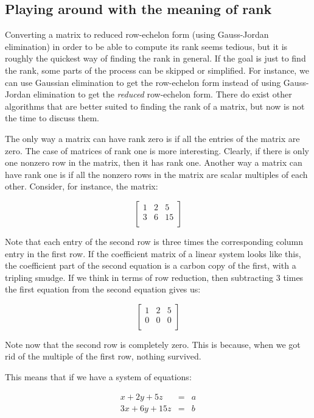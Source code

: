 \documentclass[10pt]{amsart}
\begin{document}
\subsection{Playing around with the meaning of rank}

Converting a matrix to reduced row-echelon form (using Gauss-Jordan
elimination) in order to be able to compute its rank seems tedious,
but it is roughly the quickest way of finding the rank in general. If
the goal is just to find the rank, some parts of the process can be
skipped or simplified. For instance, we can use Gaussian elimination
to get the row-echelon form instead of using Gauss-Jordan elimination
to get the {\em reduced} row-echelon form. There do exist other
algorithms that are better suited to finding the rank of a matrix, but
now is not the time to discuss them.

The only way a matrix can have rank zero is if all the entries of the
matrix are zero. The case of matrices of rank one is more
interesting. Clearly, if there is only one nonzero row in the matrix,
then it has rank one. Another way a matrix can have rank one is if all
the nonzero rows in the matrix are scalar multiples of each
other. Consider, for instance, the matrix:

$$\left[\begin{matrix}
1 & 2 & 5 \\
3 & 6 & 15 \\\end{matrix}
\right]$$

Note that each entry of the second row is three times the
corresponding column entry in the first row. If the coefficient matrix
of a linear system looks like this, the coefficient part of the second
equation is a carbon copy of the first, with a tripling smudge. If we
think in terms of row reduction, then subtracting $3$ times the first
equation from the second equation gives us:

$$\left[\begin{matrix}
1 & 2 & 5 \\
0 & 0 & 0 \\\end{matrix}
\right]$$

Note now that the second row is completely zero. This is because, when
we got rid of the multiple of the first row, nothing survived.

This means that if we have a system of equations:

\begin{eqnarray*}
  x + 2y + 5z & = & a\\
  3x + 6y + 15z & = & b\\
\end{eqnarray*}
\end{document}
